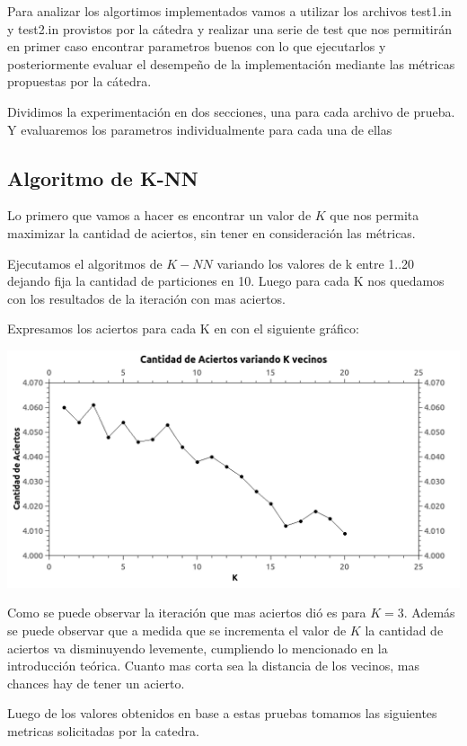 Para analizar los algortimos implementados vamos a utilizar los archivos test1.in y test2.in provistos por la cátedra y realizar una serie de test que nos permitirán en primer caso encontrar parametros buenos con lo que ejecutarlos y posteriormente evaluar el desempeño de la implementación mediante las métricas propuestas por la cátedra.

Dividimos la experimentación en dos secciones, una para cada archivo de prueba. Y evaluaremos los parametros individualmente para cada una de ellas

\subsection {Algoritmo de K-NN}

Lo primero que vamos a hacer es encontrar un valor de $K$ que nos permita maximizar la cantidad de aciertos, sin tener en consideración las métricas.

Ejecutamos el algoritmos de $K-NN$ variando los valores de k entre {1..20} dejando fija la cantidad de particiones en 10. Luego para cada K nos quedamos con los resultados de la iteración con mas aciertos.

Expresamos los aciertos para cada K en con el siguiente gráfico:
\begin{center}
\includegraphics[scale=0.6]{knn.png}
\end{center}

Como se puede observar la iteración que mas aciertos dió es para $K = 3$. Además se puede observar que a medida que se incrementa el valor de $K$ la cantidad de aciertos va disminuyendo levemente, cumpliendo lo mencionado en la introducción teórica. Cuanto mas corta sea la distancia de los vecinos, mas chances hay de tener un acierto.

Luego de los valores obtenidos en base a estas pruebas tomamos las siguientes metricas solicitadas por la catedra.

